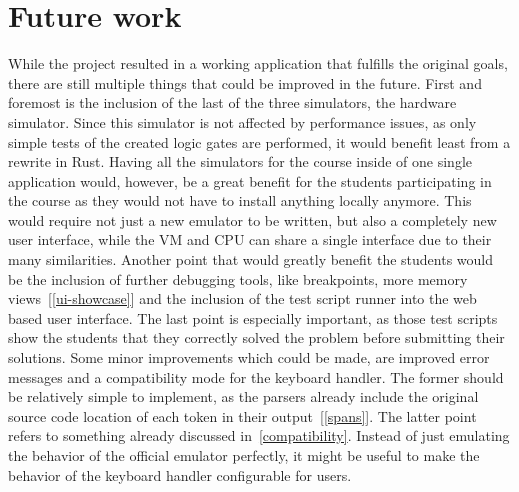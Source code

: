 \section{Future work}
\label{future-work}
While the project resulted in a working application that fulfills the original goals, there are still multiple things that could be improved in the future.
First and foremost is the inclusion of the last of the three simulators, the hardware simulator.
Since this simulator is not affected by performance issues, as only simple tests of the created logic gates are performed, it would benefit least from a rewrite in Rust.
Having all the simulators for the course inside of one single application would, however, be a great benefit for the students participating in the course as they would not have to install anything locally anymore.
This would require not just a new emulator to be written, but also a completely new user interface, while the VM and CPU can share a single interface due to their many similarities.
Another point that would greatly benefit the students would be the inclusion of further debugging tools, like breakpoints, more memory views~[\ref{ui-showcase}] and the inclusion of the test script runner into the web based user interface.
The last point is especially important, as those test scripts show the students that they correctly solved the problem before submitting their solutions.
Some minor improvements which could be made, are improved error messages and a compatibility mode for the keyboard handler.
The former should be relatively simple to implement, as the parsers already include the original source code location of each token in their output~[\ref{spans}].
The latter point refers to something already discussed in~\cref{compatibility}.
Instead of just emulating the behavior of the official emulator perfectly, it might be useful to make the behavior of the keyboard handler configurable for users.

